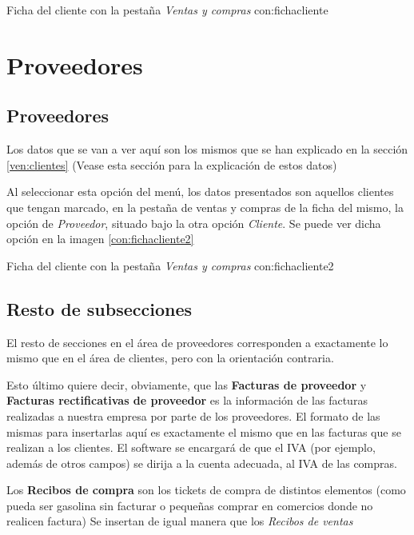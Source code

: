 {Ficha del cliente con la pestaña \emph{Ventas y compras}}
{con:fichacliente}











\section{Proveedores}

\subsection{Proveedores}
Los datos que se van a ver aquí son los mismos que se han explicado en la sección \ref{ven:clientes} (Vease esta sección para la explicación de estos datos)

Al seleccionar esta opción del menú, los datos presentados son aquellos clientes que tengan marcado, en la pestaña de ventas y compras de  la ficha del mismo, la opción de \emph{Proveedor}, situado bajo la otra opción \emph{Cliente}. Se puede ver dicha opción en la imagen \ref{con:fichacliente2}

{Ficha del cliente con la pestaña \emph{Ventas y compras}}
{con:fichacliente2}


\subsection{Resto de subsecciones}

El resto de secciones en el área de proveedores corresponden a exactamente lo mismo que en el área de clientes, pero con la orientación contraria. 

Esto último quiere decir, obviamente, que las \textbf{Facturas de proveedor} y \textbf{Facturas rectificativas de proveedor} es la información de las facturas realizadas a nuestra empresa por parte de los proveedores. El formato de las mismas para insertarlas aquí es exactamente el mismo que en las facturas que se realizan a los clientes. El software se encargará de que el IVA (por ejemplo, además de otros campos) se dirija a la cuenta adecuada, al IVA de las compras.

Los \textbf{Recibos de compra} son los tickets de compra de distintos elementos (como pueda ser gasolina sin facturar o pequeñas comprar en comercios donde no realicen factura) Se insertan de igual manera que los \emph{Recibos de ventas}

